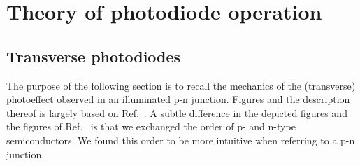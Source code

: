 \section{Theory of photodiode operation}

\subsection{Transverse photodiodes}

The purpose of the following section is to recall the mechanics of the (transverse) photoeffect observed in an illuminated p-n junction.
Figures and the description thereof is largely based on Ref.~\cite{Simon13}.
A subtle difference in the depicted figures and the figures of Ref.~\cite{Simon13} is that we exchanged the order of p- and n-type semiconductors.
We found this order to be more intuitive when referring to a p-n junction.

